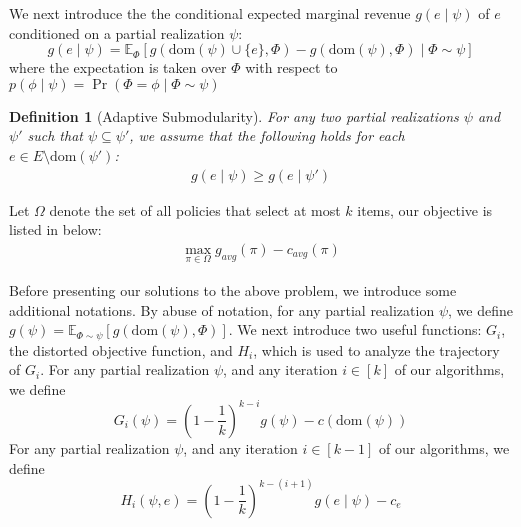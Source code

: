 \documentclass[twoside,leqno,twocolumn]{article}
\newtheorem{definition}{Definition}
\begin{document}
We next introduce the the conditional expected marginal revenue $g(e \mid \psi)$ of $e$ conditioned on a partial realization $\psi$:
 \[g(e \mid \psi)=\mathbb{E}_{\Phi}[g(\mathrm{dom}(\psi)\cup \{e\}, \Phi)-g(\mathrm{dom}(\psi), \Phi)\mid \Phi \sim \psi]\] where the expectation is taken over $\Phi$ with respect to $p(\phi\mid \psi)=\Pr(\Phi=\phi \mid \Phi \sim \psi)$
\begin{definition}[Adaptive Submodularity] For any two partial realizations $\psi$ and $\psi'$ such that $\psi\subseteq \psi'$, we assume that the following holds for each $e\in E\setminus \mathrm{dom}(\psi')$:
\begin{eqnarray}\label{def:33}
g(e\mid \psi) \geq g(e\mid \psi')
\end{eqnarray}
\end{definition}

Let $\Omega$  denote the set of all policies that select at most $k$ items, our objective is listed in below:
\begin{eqnarray}
\label{pb:1}
\max_{\pi\in \Omega} g_{avg}(\pi)-c_{avg}(\pi)
\end{eqnarray}



 Before presenting our solutions to the above problem, we introduce some additional notations. By abuse of notation,   for any partial realization $\psi$, we define $g(\psi)=\mathbb{E}_{\Phi\sim \psi} [g(\mathrm{dom}(\psi), \Phi)]$.
 We next introduce two useful functions: $G_i$, the distorted objective function,  and $H_i$, which is used to analyze
the trajectory of $G_i$. For any partial realization $\psi$, and any iteration $i\in [k]$ of our algorithms, we define
\[G_i(\psi) = (1-\frac{1}{k})^{k-i} g(\psi)-c(\textrm{dom}(\psi))\]
For any partial realization $\psi$, and any iteration $i\in [k-1]$ of our algorithms, we define
\[H_i(\psi, e) =(1-\frac{1}{k})^{k-(i+1)} g(e \mid \psi)-c_e\]
\end{document}
